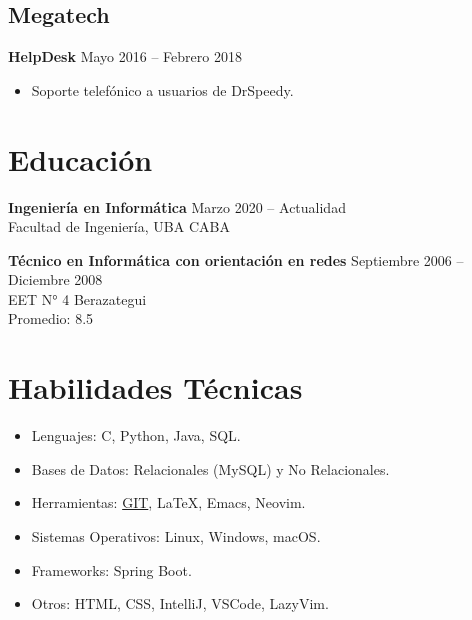 \documentclass[a4paper,10pt]{article}
\begin{document}
\subsection*{\Large\textbf{Megatech}}
\textbf{\normalsize HelpDesk} \hfill Mayo 2016 – Febrero 2018
\begin{itemize}
    \item Soporte telefónico a usuarios de DrSpeedy.
\end{itemize}

\vspace{0.5cm}

\section*{Educación}

\noindent \textbf{Ingeniería en Informática} \hfill Marzo 2020 – Actualidad \\
Facultad de Ingeniería, UBA \hfill CABA

\vspace{0.5cm}

\noindent \textbf{Técnico en Informática con orientación en redes} \hfill Septiembre 2006 – Diciembre 2008 \\
EET N° 4 \hfill Berazategui \\
Promedio: 8.5

\vspace{0.5cm}

\section*{Habilidades Técnicas}
\begin{itemize}
    \item Lenguajes: C, Python, Java, SQL.
    \item Bases de Datos: Relacionales (MySQL) y No Relacionales.
    \item Herramientas: \href{https://github.com/marcohc79} {GIT}, \LaTeX, Emacs, Neovim.
    \item Sistemas Operativos: Linux, Windows, macOS.
    \item Frameworks: Spring Boot.
    \item Otros: HTML, CSS, IntelliJ, VSCode, LazyVim.
\end{itemize}

\vspace{0.5cm}
\end{document}
